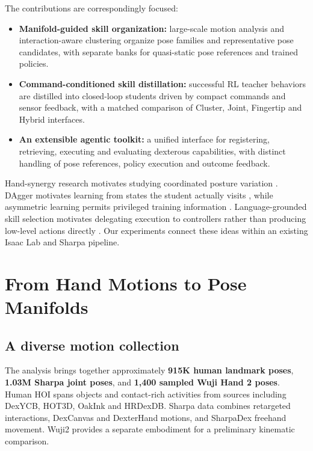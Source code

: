 \documentclass[10pt,twocolumn]{article}
\begin{document}
The contributions are correspondingly focused:

\begin{itemize}
\item \textbf{Manifold-guided skill organization:} large-scale motion analysis and interaction-aware clustering organize pose families and representative pose candidates, with separate banks for quasi-static pose references and trained policies.
\item \textbf{Command-conditioned skill distillation:} successful RL teacher behaviors are distilled into closed-loop students driven by compact commands and sensor feedback, with a matched comparison of Cluster, Joint, Fingertip and Hybrid interfaces.
\item \textbf{An extensible agentic toolkit:} a unified interface for registering, retrieving, executing and evaluating dexterous capabilities, with distinct handling of pose references, policy execution and outcome feedback.

\end{itemize}
Hand-synergy research motivates studying coordinated posture variation \citep{santello1998}. DAgger motivates learning from states the student actually visits \citep{ross2011}, while asymmetric learning permits privileged training information \citep{pinto2018}. Language-grounded skill selection motivates delegating execution to controllers rather than producing low-level actions directly \citep{ichter2023}. Our experiments connect these ideas within an existing Isaac Lab and Sharpa pipeline.

\section{From Hand Motions to Pose Manifolds}

\subsection{A diverse motion collection}

The analysis brings together approximately \textbf{915K human landmark poses}, \textbf{1.03M Sharpa joint poses}, and \textbf{1,400 sampled Wuji Hand 2 poses}. Human HOI spans objects and contact-rich activities from sources including DexYCB, HOT3D, OakInk and HRDexDB. Sharpa data combines retargeted interactions, DexCanvas and DexterHand motions, and SharpaDex freehand movement. Wuji2 provides a separate embodiment for a preliminary kinematic comparison.
\end{document}
